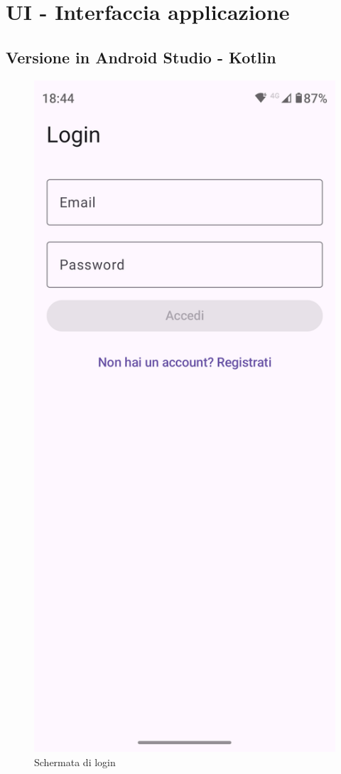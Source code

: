 \documentclass{article}
\begin{document}
\section{UI - Interfaccia applicazione}
\subsection{Versione in Android Studio - Kotlin}

\begin{figure}[H]
  \centering
  \includegraphics[width=0.6\linewidth]{login.png}
  \caption{Schermata di login}
  \label{fig:sitemap}
\end{figure}
\end{document}
